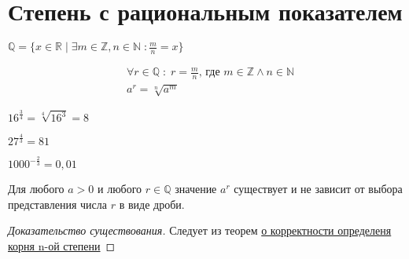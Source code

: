 \section{Степень с рациональным показателем}

\begin{remind}
$\mathbb{Q} = \{x \in \mathbb{R} \; | \; \exists m \in \mathbb{Z}, n \in \mathbb{N} \; : \frac{m}{n} = x \}$
\end{remind}

\begin{definition}
    \begin{align*}
        &\forall r \in \mathbb{Q} \; : \; r = \frac{m}{n} \text{, где } m \in \mathbb{Z} \land n \in \mathbb{N} \\
        &a^r = \sqrt[n]{a^m}
    \end{align*}
\end{definition}

\begin{example}
    $16^{\frac{3}{4}} = \sqrt[4]{16^3} = 8$ 
\end{example}

\begin{example}
    $27^{\frac{4}{3}} = 81$
\end{example}

\begin{example}
    $1000^{-\frac{2}{3}} = 0,01$
\end{example}

\begin{theorem}
    Для любого $a > 0$ и любого $r \in \mathbb{Q}$ значение $a^r$ существует и не зависит от выбора представления числа $r$ в виде дроби.
\end{theorem}

\begin{proof}[Доказательство существования]
    Следует из теорем \hyperref[thm:1.2.2]{о корректности определеня корня n-ой степени}
\end{proof}

